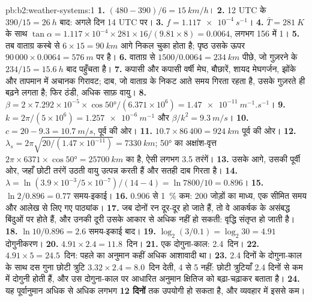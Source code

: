 \begin{solution}{pb:b2:weather-systems:1}
\textbf{1.} $(480 - 390)/6 = \qty{15}{km/h}$।
\textbf{2.} 12 UTC के $390/15 = \qty{26}{h}$ बाद: अगले दिन 14 UTC पर।
\textbf{3.} $f = \qty{1.117e-4}{s^{-1}}$।
\textbf{4.} $\bar T = \qty{281}{K}$ के साथ $\tan\alpha = 1.117 \times 10^{-4} \times 281 \times
16/(9.81 \times 8) = 0.0064$, लगभग 156 में 1।
\textbf{5.} तब वाताग्र कस्बे से $6 \times 15 = \qty{90}{km}$ आगे निकल चुका होता है; पृष्ठ उसके ऊपर
$90\,000 \times 0.0064 = \qty{576}{m}$ पर है।
\textbf{6.} वाताग्र से $1500/0.0064 = \qty{234}{km}$ पीछे, जो गुज़रने के $234/15 = \qty{15.6}{h}$
बाद पहुँचता है।
\textbf{7.} कपासी और कपासी वर्षी मेघ, बौछारें, शायद मेघगर्जन, झोंके और तापमान में अचानक
गिरावट; दाब, जो वाताग्र के निकट आते समय गिरता रहता है, उसके गुज़रते ही बढ़ने लगता है; फिर
ठंडी, अधिक साफ़ वायु।
\textbf{8.} $\beta = 2 \times 7.292 \times 10^{-5} \times \cos\ang{50}/(6.371 \times 10^6) =
\qty{1.47e-11}{m^{-1}.s^{-1}}$।
\textbf{9.} $k = 2\pi/(5 \times 10^6) = \qty{1.257e-6}{m^{-1}}$ और $\beta/k^2 = \qty{9.3}{m/s}$।
\textbf{10.} $c = 20 - 9.3 = \qty{10.7}{m/s}$, पूर्व की ओर।
\textbf{11.} $10.7 \times 86\,400 = \qty{924}{km}$ पूर्व की ओर।
\textbf{12.} $\lambda_s = 2\pi\sqrt{20/(1.47 \times 10^{-11})} = \qty{7330}{km}$; \ang{50} का
अक्षांश-वृत्त $2\pi \times 6371 \times \cos\ang{50} = \qty{25700}{km}$ का है, ऐसी लगभग 3.5
तरंगें।
\textbf{13.} उसके आगे, उसकी पूर्वी ओर, जहाँ छोटी तरंगें उठती वायु उत्पन्न करती हैं और
सतही दाब गिरता है।
\textbf{14.} $\lambda = \ln(3.9 \times 10^{-3}/5 \times 10^{-7})/(14 - 4) = \ln 7800/10 = 0.896$।
\textbf{15.} $\ln 2/0.896 = 0.77$ समय-इकाई।
\textbf{16.} 0.906 से \qty{1}{\percent} कम: 200 जोड़ों का माध्य, एक सीमित समय और आलेख से लिए गए
पाठ्यांक।
\textbf{17.} जब दोनों रन दूर-दूर हो जाते हैं, तो वे आकर्षक के असंबद्ध बिंदुओं पर होते हैं, और
उनकी दूरी उसके आकार से अधिक नहीं हो सकती: वृद्धि संतृप्त हो जाती है।
\textbf{18.} $\ln 10/0.896 = 2.6$ समय-इकाई बाद।
\textbf{19.} $\log_2(3/0.1) = \log_2 30 = 4.91$ दोगुनीकरण।
\textbf{20.} $4.91 \times 2.4 = 11.8$~दिन।
\textbf{21.} एक दोगुना-काल: 2.4~दिन।
\textbf{22.} $4.91 \times 5 = 24.5$~दिन: पहले का अनुमान कहीं अधिक आशावादी था।
\textbf{23.} 2.4 दिनों के दोगुना-काल के साथ दस गुना छोटी त्रुटि $3.32 \times 2.4
= 8.0$~दिन देती, 4 से 5 नहीं: छोटी त्रुटियाँ 2.4 दिनों से कम में दोगुनी होती हैं, और उस
दोगुना-काल पर आधारित अनुमान क्षितिज को बढ़ा-चढ़ाकर बताता है।
\textbf{24.} यह पूर्वानुमान अधिक से अधिक लगभग \textbf{12 दिनों} तक उपयोगी हो सकता है, और व्यवहार में
इससे कम।
\end{solution}
